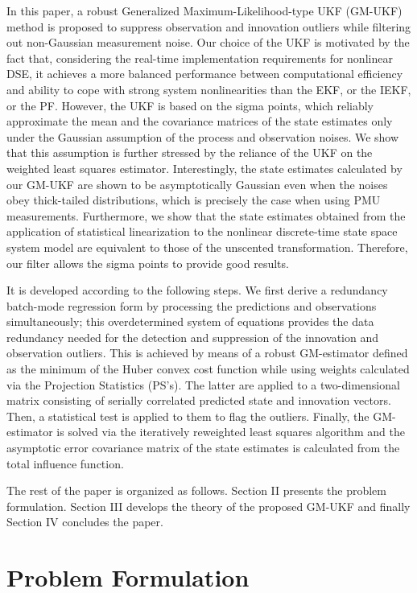\documentclass[10pt]{IEEEtran}
\begin{document}
In this paper, a robust Generalized Maximum-Likelihood-type UKF (GM-UKF) method is proposed to suppress observation and innovation outliers while filtering out non-Gaussian measurement noise. Our choice of the UKF is motivated by the fact that, considering the real-time implementation requirements for nonlinear DSE, it achieves a more balanced performance between computational efficiency and ability to cope with strong system nonlinearities than the EKF, or the IEKF, or the PF. However, the UKF is based on the sigma points, which reliably approximate the mean and the covariance matrices of the state estimates only under the Gaussian assumption of the process and observation noises. We show that this assumption is further stressed by the reliance of the UKF on the weighted least squares estimator. Interestingly, the state estimates calculated by our GM-UKF are shown to be asymptotically Gaussian even when the noises obey thick-tailed distributions, which is precisely the case when using PMU measurements. Furthermore, we show that the state estimates obtained from the application of statistical linearization to the nonlinear discrete-time state space system model are equivalent to those of the unscented transformation. Therefore, our filter allows the sigma points to provide good results.

It is developed according to the following steps. We first derive a redundancy batch-mode regression form by processing the predictions and observations simultaneously; this overdetermined system of equations provides the data redundancy needed for the detection and suppression of the innovation and observation outliers. This is achieved by means of a robust GM-estimator defined as the minimum of the Huber convex cost function while using weights calculated via the Projection Statistics (PS's). The latter are applied to a two-dimensional matrix consisting of serially correlated predicted state and innovation vectors. Then, a statistical test is applied to them to flag the outliers. Finally, the GM-estimator is solved via the iteratively reweighted least squares algorithm and the asymptotic error covariance matrix of the state estimates is calculated from the total influence function.

The rest of the paper is organized as follows. Section II presents the problem formulation. Section III develops the theory of the proposed GM-UKF and finally Section IV concludes the paper.
\vspace{-0.2cm}
\section{Problem Formulation}
\end{document}
